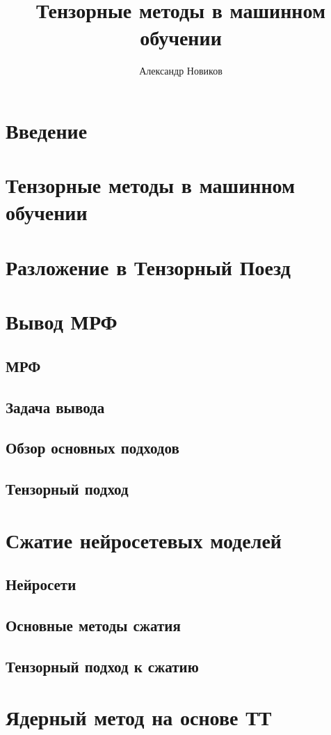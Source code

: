 \documentclass{article} %
\title{Тензорные методы в машинном обучении}
\author{Александр Новиков}
\begin{document}
\maketitle

\section{Введение}
\section{Тензорные методы в машинном обучении}
\section{Разложение в Тензорный Поезд}
\section{Вывод МРФ}
\subsection{МРФ}
\subsection{Задача вывода}
\subsection{Обзор основных подходов}
\subsection{Тензорный подход}
\section{Сжатие нейросетевых моделей}
\subsection{Нейросети}
\subsection{Основные методы сжатия}
\subsection{Тензорный подход к сжатию}
\section{Ядерный метод на основе ТТ}
\end{document}
